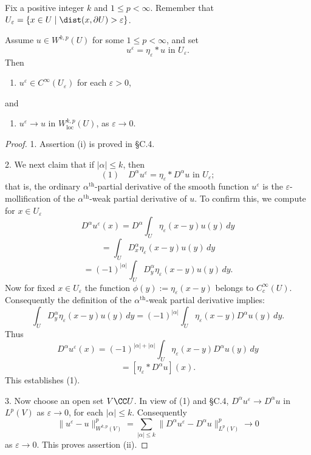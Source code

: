 Fix a positive integer $k$ and $1 \le p < \infty$. Remember that $U_\varepsilon = \{x \in U \mid \dist(x, \partial U) > \varepsilon\}$.

\begin{theorem}
\label{thm:local-smooth-approximation}
Assume $u \in W^{k,p}(U)$ for some $1 \le p < \infty$, and set
$$u^\varepsilon = \eta_\varepsilon * u \text{ in } U_\varepsilon.$$
Then
\begin{enumerate}
\item[(i)] $u^\varepsilon \in C^\infty(U_\varepsilon)$ for each $\varepsilon > 0$,
\end{enumerate}
and
\begin{enumerate}
\item[(ii)] $u^\varepsilon \to u$ in $W^{k,p}_{\text{loc}}(U)$, as $\varepsilon \to 0$.
\end{enumerate}
\end{theorem}

\begin{proof}
1. Assertion (i) is proved in §C.4.

2. We next claim that if $|\alpha| \le k$, then
$$(1) \quad D^\alpha u^\varepsilon = \eta_\varepsilon * D^\alpha u \text{ in } U_\varepsilon;$$
that is, the ordinary $\alpha^{\text{th}}$-partial derivative of the smooth function $u^\varepsilon$ is the $\varepsilon$-mollification of the $\alpha^{\text{th}}$-weak partial derivative of $u$. To confirm this, we compute for $x \in U_\varepsilon$
$$D^\alpha u^\varepsilon(x) = D^\alpha \int_U \eta_\varepsilon(x-y)u(y)\,dy$$
$$= \int_U D_x^\alpha \eta_\varepsilon(x-y)u(y)\,dy$$
$$= (-1)^{|\alpha|} \int_U D_y^\alpha \eta_\varepsilon(x-y)u(y)\,dy.$$
Now for fixed $x \in U_\varepsilon$ the function $\phi(y) := \eta_\varepsilon(x-y)$ belongs to $C_c^\infty(U)$. Consequently the definition of the $\alpha^{\text{th}}$-weak partial derivative implies:
$$\int_U D_y^\alpha \eta_\varepsilon(x-y)u(y)\,dy = (-1)^{|\alpha|} \int_U \eta_\varepsilon(x-y)D^\alpha u(y)\,dy.$$
Thus
$$D^\alpha u^\varepsilon(x) = (-1)^{|\alpha|+|\alpha|}\int_U \eta_\varepsilon(x-y)D^\alpha u(y)\,dy$$
$$= [\eta_\varepsilon * D^\alpha u](x).$$
This establishes (1).

3. Now choose an open set $V \CC U$. In view of (1) and §C.4, $D^\alpha u^\varepsilon \to D^\alpha u$ in $L^p(V)$ as $\varepsilon \to 0$, for each $|\alpha| \le k$. Consequently
$$\|u^\varepsilon - u\|_{W^{k,p}(V)}^p = \sum_{|\alpha|\le k} \|D^\alpha u^\varepsilon - D^\alpha u\|_{L^p(V)}^p \to 0$$
as $\varepsilon \to 0$. This proves assertion (ii).
\end{proof}

